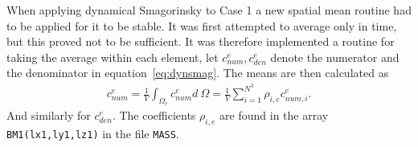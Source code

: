 When applying dynamical Smagorinsky to Case 1 a new spatial mean routine had to be applied for it to be stable. 
It was first attempted to average only in time, but this proved not to be sufficient. It was
therefore implemented a routine for taking the average within each element, let 
$c_{num}^e,c_{den}^e$ denote the numerator and the denominator in equation~\ref{eq:dynsmag}.
The means are then calculated as 
\begin{align}
    c_{num}^e = \frac{1}{V}\int_{\Omega_e}c_{num}^e d\: \Omega 
    = \frac{1}{V}\sum_{i = 1}^{N^3}\rho_{i,e}c_{num,i}^{e}.
    \label{eq:averageroutine}
\end{align}
And similarly for $c_{den}^e$.
The coefficients $\rho_{i,e}$ are found in the array \verb|BM1(lx1,ly1,lz1)| in the file 
\verb|MASS|.
